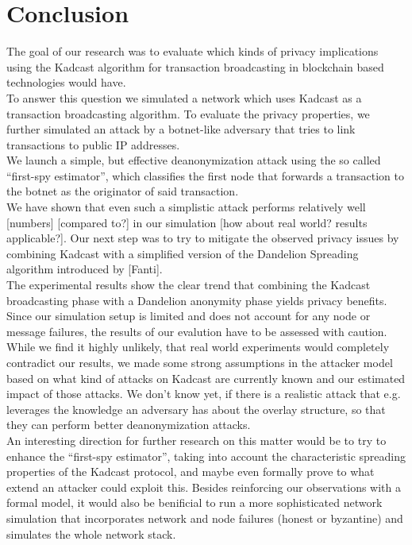 \section{Conclusion}
The goal of our research was to evaluate which kinds of privacy implications using the Kadcast algorithm for
transaction broadcasting in blockchain based technologies would have. \\
To answer this question we simulated a network which uses Kadcast as a transaction broadcasting algorithm.
To evaluate the privacy properties, we further simulated an attack by a botnet-like adversary that tries
to link transactions to public IP addresses.\\
We launch a simple, but effective deanonymization attack using the so called ``first-spy estimator'', which
classifies the first node that forwards a transaction to the botnet as the originator of said transaction. \\
We have shown that even such a simplistic attack performs relatively well [numbers] [compared to?] in our simulation [how about real world? results applicable?].
Our next step was to try to mitigate the observed privacy issues by
combining Kadcast with a simplified version of the Dandelion Spreading
algorithm introduced by [Fanti]. \\
The experimental results show the clear trend that combining the Kadcast broadcasting phase with a Dandelion anonymity phase
yields privacy benefits. \\
Since our simulation setup is limited and does not account for any node or message failures,
the results of our evalution have to be assessed with caution.
While we find it highly unlikely, that real world experiments would completely contradict our results, we made some strong
assumptions in the attacker model based on what kind of attacks on Kadcast are currently known and our estimated impact of those attacks.
We don't know yet, if there is a realistic attack that e.g. leverages the knowledge an adversary has about the overlay structure,
so that they can perform better deanonymization attacks. \\
An interesting direction for further research on this matter would be to try to enhance the ``first-spy estimator'',
taking into account the characteristic spreading properties of the Kadcast protocol,
and maybe even formally prove to what extend an attacker could exploit this.
Besides reinforcing our observations with a formal model, it would also be benificial to run a more sophisticated network simulation
that incorporates network and node failures (honest or byzantine) and simulates the whole network stack.
